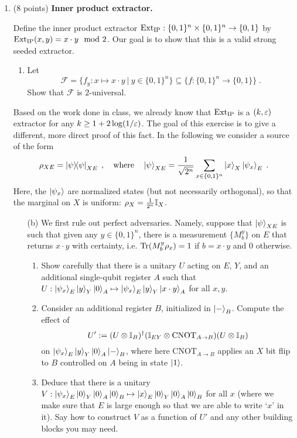 \documentclass[12pt]{article}
\begin{document}
\begin{enumerate}
\item (8 points) {\bf Inner product extractor.}

Define the inner product extractor $\mathrm{Ext}_{\mathrm{IP}}:\{0,1\}^n\times\{0,1\}^n\to\{0,1\}$ by $\mathrm{Ext}_{\mathrm{IP}}(x,y)=x\cdot y\mod 2$. Our goal is to show that this is a valid strong seeded extractor. 
\begin{enumerate}
\item Let 
\[\mathcal{F}=\big\{f_y:x\mapsto x\cdot y \ | \ y\in\{0,1\}^n\big\}\subseteq \big\{ f: \{0,1\}^n\to\{0,1\}\big\}\;.\]
Show that $\mathcal{F}$ is $2$-universal.
\end{enumerate}
Based on the work done in class, we already know that $\mathrm{Ext}_{\mathrm{IP}}$ is a $(k,\varepsilon)$ extractor for any $k\geq 1+2\log(1/\varepsilon)$. The goal of this exercise is to give a different, more direct proof of this fact. In the following we consider a source of the form
\[\rho_{XE}=\ket{\psi}\!\!\bra{\psi}_{XE}\;, \quad\text{where}\quad \ket{\psi}_{XE}=\frac{1}{\sqrt{2^n}} \sum_{x\in\{0,1\}^n} \ket{x}_X\ket{\psi_x}_E\;.\]
Here, the $\ket{\psi_x}$ are normalized states (but not necessarily orthogonal), so that the marginal on $X$ is uniform: $\rho_X= \frac{1}{2^n}\mathbb{I}_X$. 
\begin{enumerate}
\item[(b)] We first rule out perfect adversaries. Namely, suppose that $\ket{\psi}_{XE}$ is such that given any $y\in\{0,1\}^n$, there is a measurement $\{M^y_b\}$ on $E$ that returns $x\cdot y$ with certainty, i.e. $\mathrm{Tr}(M^y_{b} \rho_x)=1$ if $b=x\cdot y$ and $0$ otherwise. 
 \begin{enumerate}
\item Show carefully that there is a unitary $U$ acting on $E$, $Y$, and an additional single-qubit register $A$ such that $U:\ket{\psi_x}_E\ket{y}_Y\ket{0}_A \mapsto \ket{\psi_x}_E\ket{y}_Y\ket{x\cdot y}_A$ for all $x,y$.
\item Consider an additional register $B$, initialized in $\ket{-}_B$. Compute the effect of  
\[  U':=(U\otimes \mathbb{I}_B)^\dagger (\mathbb{I}_{EY}\otimes \mathrm{CNOT}_{A\to B})(U\otimes \mathbb{I}_{B})\]
 on $\ket{\psi_x}_E\ket{y}_Y\ket{0}_A\ket{-}_B$, where here  $\mathrm{CNOT}_{A\to B}$ applies an $X$ bit flip to $B$ controlled on $A$ being in state $\ket{1}$.
\item Deduce that there is a unitary $V: \ket{\psi_x}_E\ket{0}_Y\ket{0}_A\ket{0}_B\mapsto \ket{x}_E\ket{0}_Y\ket{0}_A\ket{0}_B$ for all $x$ (where we make sure that $E$ is large enough so that we are able to write `$x$' in it). Say how to construct $V$ as a function of $U'$ and any other building blocks you may need. 

\end{enumerate}
\end{enumerate}
\end{enumerate}
\end{document}
